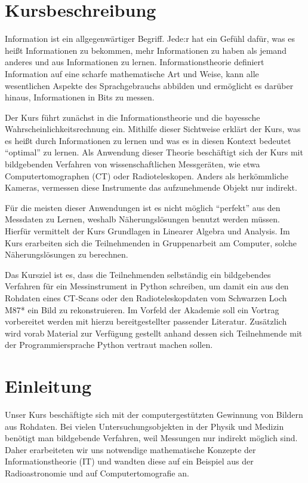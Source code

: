 \section*{Kursbeschreibung}
Information ist ein allgegenwärtiger Begriff. Jede:r hat ein Gefühl dafür, was es heißt Informationen zu bekommen, mehr Informationen zu haben als jemand anderes und aus Informationen zu lernen.
Informationstheorie definiert Information auf eine scharfe mathematische Art und Weise, kann alle wesentlichen Aspekte des Sprachgebrauchs abbilden und ermöglicht es darüber hinaus, Informationen in Bits zu messen.

Der Kurs führt zunächst in die Informationstheorie und die bayessche Wahrscheinlichkeitsrechnung ein.
Mithilfe dieser Sichtweise erklärt der Kurs, was es heißt durch Informationen zu lernen und was es in diesen Kontext bedeutet \enquote{optimal} zu lernen.
Als Anwendung dieser Theorie beschäftigt sich der Kurs mit bildgebenden Verfahren von wissenschaftlichen Messgeräten, wie etwa Computertomographen (CT) oder Radioteleskopen.
Anders als herkömmliche Kameras, vermessen diese Instrumente das aufzunehmende Objekt nur indirekt.

Für die meisten dieser Anwendungen ist es nicht möglich \enquote{perfekt} aus den Messdaten zu Lernen, weshalb Näherungslösungen benutzt werden müssen.
Hierfür vermittelt der Kurs Grundlagen in Linearer Algebra und Analysis.
Im Kurs erarbeiten sich die Teilnehmenden in Gruppenarbeit am Computer, solche Näherungslösungen zu berechnen.

Das Kursziel ist es, dass die Teilnehmenden selbständig ein bildgebendes Verfahren für ein Messinstrument in Python schreiben, um damit ein aus den Rohdaten eines CT-Scans oder den Radioteleskopdaten vom Schwarzen Loch M87* ein Bild zu rekonstruieren.
Im Vorfeld der Akademie soll ein Vortrag vorbereitet werden mit hierzu bereitgestellter passender Literatur.
Zusätzlich wird vorab Material zur Verfügung gestellt anhand dessen sich Teilnehmende mit der Programmiersprache Python vertraut machen sollen.

\section{Einleitung}

Unser Kurs beschäftigte sich mit der computergestützten Gewinnung von Bildern aus Rohdaten.
Bei vielen Untersuchungsobjekten in der Physik und Medizin benötigt man bildgebende Verfahren, weil Messungen nur indirekt möglich sind.
Daher erarbeiteten wir uns notwendige mathematische Konzepte der Informationstheorie (IT) und wandten diese auf ein Beispiel aus der Radioastronomie und auf Computertomografie an.

